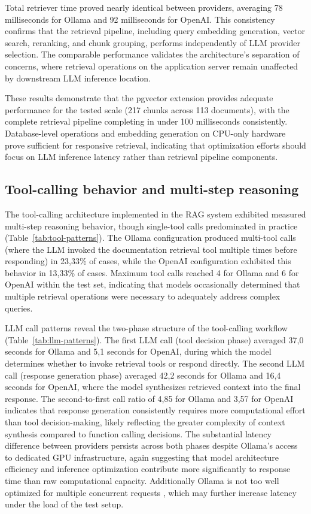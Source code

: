 Total retriever time proved nearly identical between providers, averaging 78 milliseconds for Ollama and 92 milliseconds for OpenAI. This consistency confirms that the retrieval pipeline, including query embedding generation, vector search, reranking, and chunk grouping, performs independently of LLM provider selection. The comparable performance validates the architecture's separation of concerns, where retrieval operations on the application server remain unaffected by downstream LLM inference location.

These results demonstrate that the pgvector extension provides adequate performance for the tested scale (217 chunks across 113 documents), with the complete retrieval pipeline completing in under 100 milliseconds consistently. Database-level operations and embedding generation on CPU-only hardware prove sufficient for responsive retrieval, indicating that optimization efforts should focus on LLM inference latency rather than retrieval pipeline components.

\subsection{Tool-calling behavior and multi-step reasoning}
\label{subsec:agentic-behavior}

The tool-calling architecture implemented in the RAG system exhibited measured multi-step reasoning behavior, though single-tool calls predominated in practice (Table~\ref{tab:tool-patterns}). The Ollama configuration produced multi-tool calls (where the LLM invoked the documentation retrieval tool multiple times before responding) in 23,33\% of cases, while the OpenAI configuration exhibited this behavior in 13,33\% of cases. Maximum tool calls reached 4 for Ollama and 6 for OpenAI within the test set, indicating that models occasionally determined that multiple retrieval operations were necessary to adequately address complex queries.

LLM call patterns reveal the two-phase structure of the tool-calling workflow (Table~\ref{tab:llm-patterns}). The first LLM call (tool decision phase) averaged 37,0 seconds for Ollama and 5,1 seconds for OpenAI, during which the model determines whether to invoke retrieval tools or respond directly. The second LLM call (response generation phase) averaged 42,2 seconds for Ollama and 16,4 seconds for OpenAI, where the model synthesizes retrieved context into the final response. The second-to-first call ratio of 4,85 for Ollama and 3,57 for OpenAI indicates that response generation consistently requires more computational effort than tool decision-making, likely reflecting the greater complexity of context synthesis compared to function calling decisions. The substantial latency difference between providers persists across both phases despite Ollama's access to dedicated GPU infrastructure, again suggesting that model architecture efficiency and inference optimization contribute more significantly to response time than raw computational capacity. Additionally Ollama is not too well optimized for multiple concurrent requests \parencite{umeshOllamaVsVLLM2025}, which may further increase latency under the load of the test setup.

